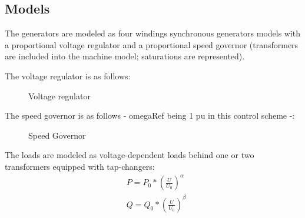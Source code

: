 \documentclass[a4paper, 12pt]{report}
\begin{document}
\subsection{Models}

The generators are modeled as four windings synchronous generators models with a proportional voltage regulator and a proportional speed governor (transformers are included into the machine model; saturations are represented).

The voltage regulator is as follows:
\begin{figure}[H]
\centering
{}
\caption{Voltage regulator}
\end{figure}

The speed governor is as follows - omegaRef being 1 pu in this control scheme -:
\begin{figure}[H]
\centering
{}
\caption{Speed Governor}
\end{figure}

The loads are modeled as voltage-dependent loads behind one or two transformers equipped with tap-changers:
\begin{equation*}
\begin{aligned}
& P = P_{0} * (\frac{U}{U_{0}})^\alpha \\
& Q = Q_{0} * (\frac{U}{U_{0}})^\beta
\end{aligned}
\label{Voltage-dependent load model}
\end{equation*}
\end{document}
